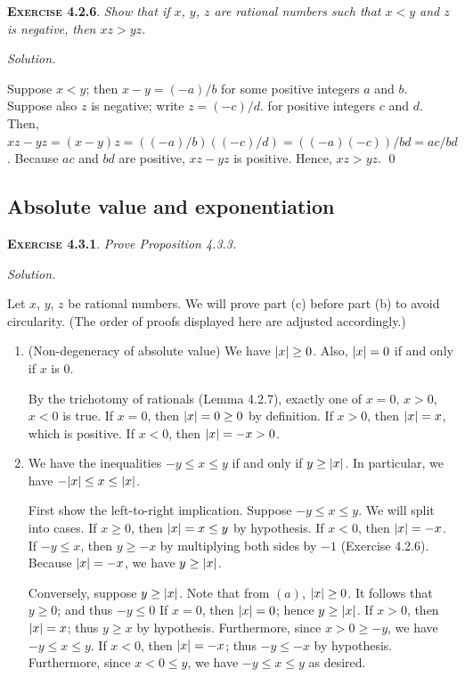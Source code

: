 \documentclass[12pt]{article}
\theoremstyle{remark}
\newenvironment{exer}[2]{
    \noindent \setlength{\parskip}{1em}%
    \textsc{\textbf{Exercise #1}}. \textit{#2} \par
    \noindent \textit{Solution.} %
}{\bigskip}
\begin{document}
\begin{exer}{4.2.6}{
    Show that if $x$, $y$, $z$ are rational numbers such that $x < y$ and $z$ is negative, then $xz > yz$.
}
    Suppose $x < y$; then $x - y = (-a) / b$ for some positive integers $a$ and $b$.
    Suppose also $z$ is negative; write $z = (-c) / d$. for positive integers $c$ and $d$.
    Then, $xz - yz = (x - y)z = ((-a) / b)((-c) / d) = ((-a)(-c)) / bd = ac / bd$.
    Because $ac$ and $bd$ are positive, $xz - yz$ is positive.
    Hence, $xz > yz$. \qed
\end{exer}


\subsection{Absolute value and exponentiation}

\begin{exer}{4.3.1}{
    Prove Proposition 4.3.3.
}
    Let $x$, $y$, $z$ be rational numbers.
    We will prove part (c) before part (b) to avoid circularity.
    (The order of proofs displayed here are adjusted accordingly.)
    
    \begin{enumerate}[topsep=0mm,label=(\alph*)]
        \item[(a)] (Non-degeneracy of absolute value) We have $\abs{x} \ge 0$. Also, $\abs{x} = 0$ if and only if $x$ is $0$.

            By the trichotomy of rationals (Lemma 4.2.7), exactly one of $x = 0$, $x > 0$, $x < 0$ is true.
            If $x = 0$, then $\abs{x} = 0 \ge 0$ by definition.
            If $x > 0$, then $\abs{x} = x$, which is positive.
            If $x < 0$, then $\abs{x} = -x > 0$.

        \item[(c)] We have the inequalities $-y \le x \le y$ if and only if $y \ge \abs{x}$. In particular, we have $-\abs{x} \le x \le \abs{x}$.

            First show the left-to-right implication.
            Suppose $-y \le x \le y$.
            We will split into cases.
            If $x \ge 0$, then $\abs{x} = x \le y$ by hypothesis.
            If $x < 0$, then $\abs{x} = -x$.
            If $-y \le x$, then $y \ge -x$ by multiplying both sides by $-1$ (Exercise 4.2.6).
            Because $\abs{x} = -x$, we have $y \ge \abs{x}$.

            Conversely, suppose $y \ge \abs{x}$.
            Note that from $(a)$, $\abs{x} \ge 0$.
            It follows that $y \ge 0$; and thus $-y \le 0$
            If $x = 0$, then $\abs{x} = 0$; hence $y \ge \abs{x}$.
            If $x > 0$, then $\abs{x} = x$; thus $y \ge x$ by hypothesis.
            Furthermore, since $x > 0 \ge -y$, we have $-y \le x \le y$.
            If $x < 0$, then $\abs{x} = -x$; thus $-y \le -x$ by hypothesis.
            Furthermore, since $x < 0 \le y$, we have $-y \le x \le y$ as desired.
            

\end{enumerate}
\end{exer}
\end{document}
